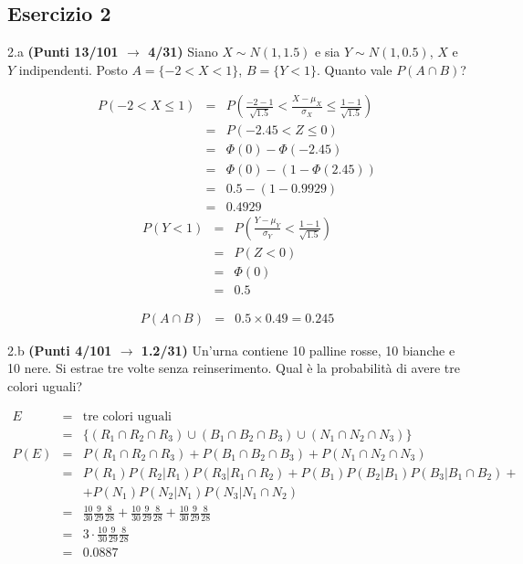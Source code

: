 \documentclass[
  11pt,
]{book}
\theoremstyle{mytheoremstyle}
\theoremstyle{mydefstyle}
\newenvironment{sol}
  {
  \begin{tcolorbox}[enhanced,breakable,arc=0.1mm,boxrule=1pt,colback=white,colframe=iblue,
  title=\bf \fontfamily{lmss}\selectfont \hspace{.5 cm} Soluzione,drop fuzzy shadow]

}{
\end{tcolorbox}
  }
\begin{document}
\subsection{Esercizio 2}\label{esercizio-2-22}

2.a \textbf{(Punti 13/101 \(\rightarrow\) 4/31)} Siano \(X\sim N(1,1.5)\) e sia \(Y\sim N(1,0.5)\), \(X\) e \(Y\) indipendenti. Posto \(A=\{-2<X<1\}\), \(B=\{Y<1\}\).
Quanto vale \(P(A\cap B)\)?

\begin{sol}
\begin{eqnarray*}
   P( -2 < X \leq  1 ) &=& P\left( \frac { -2  -  1 }{\sqrt{ 1.5 }} < \frac { X  -  \mu_X }{ \sigma_X } \leq \frac { 1  -  1 }{\sqrt{ 1.5 }}\right)  \\
              &=& P\left(  -2.45  < Z \leq  0 \right) \\
              &=& \Phi( 0 )-\Phi( -2.45 )\\
              &=&  \Phi( 0 )-(1-\Phi( 2.45 )) \\ &=&  0.5 -(1- 0.9929 ) \\ 
              &=&  0.4929 
   \end{eqnarray*}
\begin{eqnarray*}
      P( Y   <   1 ) 
        &=& P\left(  \frac { Y  -  \mu_Y }{ \sigma_Y }  <  \frac { 1  -  1 }{\sqrt{ 1.5 }} \right)  \\
                 &=& P\left(  Z   <   0 \right) \\    
                 &=&  \Phi( 0 ) \\ &=&  0.5 
      \end{eqnarray*}

\begin{eqnarray*}
  P(A\cap B) &=&0.5\times 0.49 = 0.245
\end{eqnarray*}

\end{sol}

2.b \textbf{(Punti 4/101 \(\rightarrow\) 1.2/31)} Un'urna contiene 10 palline rosse, 10 bianche e 10 nere. Si estrae tre volte senza reinserimento. Qual è la probabilità di avere tre colori uguali?

\begin{sol}
\begin{eqnarray*}
  E &=& \text{tre colori uguali}\\
   &=& \{(R_1\cap R_2 \cap R_3)\cup (B_1\cap B_2 \cap B_3)\cup (N_1\cap N_2 \cap N_3)\}\\
P(E) &=& P(R_1\cap R_2 \cap R_3) + P(B_1\cap B_2 \cap B_3) + P(N_1\cap N_2 \cap N_3)\\
&=& P(R_1)P(R_2|R_1)P(R_3|R_1\cap R_2)+P(B_1)P(B_2|B_1)P(B_3|B_1\cap B_2)+\\
& & + P(N_1)P(N_2|N_1)P(N_3|N_1\cap N_2)\\
&=& \frac {10}{30}\frac 9{29}\frac 8{28} + \frac {10}{30}\frac 9{29}\frac 8{28} +\frac {10}{30}\frac 9{29}\frac 8{28} \\
&=& 3\cdot \frac {10}{30}\frac 9{29}\frac 8{28} \\
&=& 0.0887
\end{eqnarray*}

\end{sol}
\end{document}
